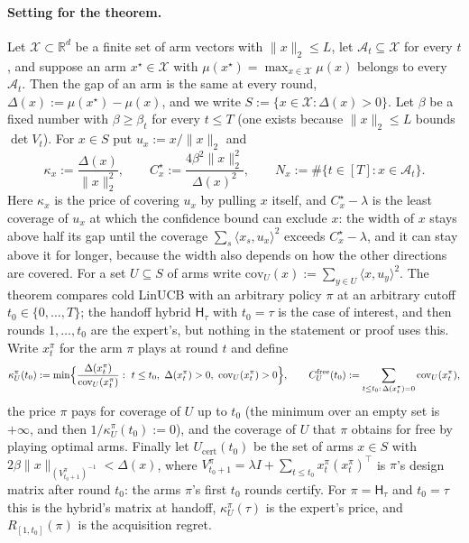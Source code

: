 \documentclass{article}
\theoremstyle{definition}
\theoremstyle{remark}
\newcommand{\R}{\mathbb{R}}
\theoremstyle{remark}
\newcommand{\Hyb}{\mathsf{H}}
\begin{document}
\paragraph{Setting for the theorem.}
Let $\mathcal X\subset\R^d$ be a finite set of arm vectors with
$\|x\|_2\le L$, let $\mathcal A_t\subseteq\mathcal X$ for every $t$, and
suppose an arm $x^\star\in\mathcal X$ with
$\mu(x^\star)=\max_{x\in\mathcal X}\mu(x)$ belongs to every $\mathcal A_t$.
Then the gap of an arm is the same at every round,
$\Delta(x):=\mu(x^\star)-\mu(x)$, and we write
$S:=\{x\in\mathcal X:\Delta(x)>0\}$. Let $\beta$ be a fixed number with
$\beta\ge\beta_t$ for every $t\le T$ (one exists because $\|x\|_2\le L$ bounds
$\det V_t$). For $x\in S$ put $u_x:=x/\|x\|_2$ and
\[
\kappa_x:=\frac{\Delta(x)}{\|x\|_2^2},\qquad
C^\star_x:=\frac{4\beta^2\|x\|_2^2}{\Delta(x)^2},\qquad
N_x:=\#\{t\in[T]:x\in\mathcal A_t\}.
\]
Here $\kappa_x$ is the price of covering $u_x$ by pulling $x$ itself, and
$C^\star_x-\lambda$ is the least coverage of $u_x$ at which the confidence
bound can exclude $x$: the width of $x$ stays above half its gap until the
coverage $\sum_s\langle x_s,u_x\rangle^2$ exceeds $C^\star_x-\lambda$, and it
can stay above it for longer, because the width also depends on how the other
directions are covered. For a set $U\subseteq S$ of arms write
$\mathrm{cov}_U(x):=\sum_{y\in U}\langle x,u_y\rangle^2$. The theorem compares
cold LinUCB with an arbitrary policy $\pi$ at an arbitrary cutoff
$t_0\in\{0,\dots,T\}$; the handoff hybrid $\Hyb_\tau$ with $t_0=\tau$ is the
case of interest, and then rounds $1,\dots,t_0$ are the expert's, but nothing
in the statement or proof uses this. Write $x^\pi_t$ for the arm $\pi$ plays
at round $t$ and define
\[
\kappa^\pi_U(t_0):=\min\Bigl\{\frac{\Delta(x^\pi_t)}{\mathrm{cov}_U(x^\pi_t)}:
\ t\le t_0,\ \Delta(x^\pi_t)>0,\ \mathrm{cov}_U(x^\pi_t)>0\Bigr\},
\qquad
C^{\mathrm{free}}_U(t_0):=\sum_{t\le t_0:\,\Delta(x^\pi_t)=0}\mathrm{cov}_U(x^\pi_t),
\]
the price $\pi$ pays for coverage of $U$ up to $t_0$ (the minimum over an
empty set is $+\infty$, and then $1/\kappa^\pi_U(t_0):=0$), and the coverage of $U$
that $\pi$ obtains for free by playing optimal arms. Finally let
$U_{\mathrm{cert}}(t_0)$ be the set of arms $x\in S$ with
$2\beta\|x\|_{(V^\pi_{t_0+1})^{-1}}<\Delta(x)$, where
$V^\pi_{t_0+1}=\lambda I+\sum_{t\le t_0}x^\pi_t (x^\pi_t)^\top$ is $\pi$'s design
matrix after round $t_0$: the arms $\pi$'s first $t_0$ rounds certify.
For $\pi=\Hyb_\tau$ and $t_0=\tau$ this is the hybrid's matrix at handoff,
$\kappa^\pi_U(\tau)$ is the expert's price, and $R_{[1,t_0]}(\pi)$ is the acquisition
regret.
\end{document}
